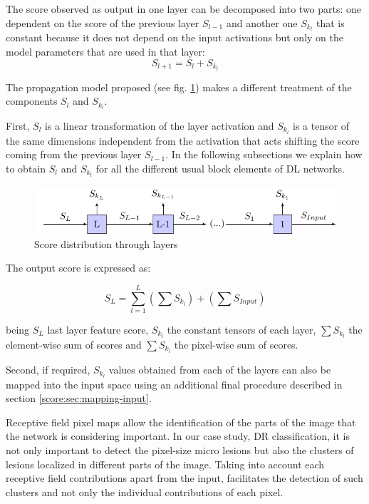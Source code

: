 \begin{proposition}
	The score observed as output in one layer can be decomposed into two parts: one dependent on the score of the previous layer $S_{l-1}$ and another one $S_{k_l}$  that is constant because it does not depend on the input activations but only on the model parameters that are used in that layer:
	\begin{equation}
	S_{l+1} = S_{l} + S_{k_l}
	\end{equation}
\end{proposition}

The propagation model proposed (see fig. \ref{score:fig:score_map}) makes a different treatment of the components $S_l$ and $S_{k_l}$. 

First, $S_l$ is a linear transformation of the layer activation and $S_{k_l}$ is a tensor of the same dimensions independent from the activation that acts shifting the score coming from the previous layer $S_{l-1}$. In the following subsections we explain how to obtain $S_l$ and $S_{k_l}$ for all the different usual block elements of DL networks.

\begin{figure}[h!]
	\centering
	\includegraphics{Figures/chapter_interpretation/figures/score_map.pdf}
	\caption{Score distribution through layers}
	\label{score:fig:score_map}
\end{figure}

The output score is expressed as:

\begin{equation}
S_L = \sum_{l=1}^L \left ( \sum S_{k_l} \right ) + \left ( \sum S_{Input} \right )
\end{equation}

being $S_L$ last layer feature score, $S_{k_l}$ the constant tensors of each layer, $\sum S_{k_l}$ the element-wise sum of scores and $\sum S_{k_l}$ the pixel-wise sum of scores.

Second, if required, $S_{k_l}$ values obtained from each of the layers can also be mapped into the input space using an additional final procedure described in section \ref{score:sec:mapping-input}.

Receptive field pixel maps allow the identification of the parts of the image that the network is considering important. In our case study, DR classification, it is not only important to detect the pixel-size micro lesions but also the clusters of lesions localized in different parts of the image. Taking into account each receptive field contributions apart from the input, facilitates the detection of such clusters and not only the individual contributions of each pixel. 

